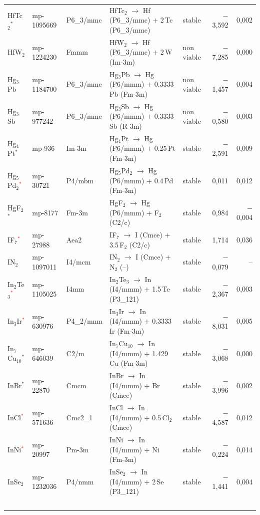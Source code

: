 \begin{longtable}{@{}ll l@{\hspace{4pt}} p{4.6cm} l@{\hspace{4pt}} rr@{}}
HfTc$_{2}$$^*$ & mp-1095669 & P6\_3/mmc & HfTc$_{2}$ $\to$ Hf (P6\_3/mmc) $+$ 2\,Tc (P6\_3/mmc) & stable & $-$3{,}592 & 0{,}002 \\
HfW$_{2}$ & mp-1224230 & Fmmm & HfW$_{2}$ $\to$ Hf (P6\_3/mmc) $+$ 2\,W (Im-3m) & non viable & $-$7{,}285 & 0{,}000 \\
Hg$_{3}$Pb & mp-1184700 & P6\_3/mmc & Hg$_{3}$Pb $\to$ Hg (P6/mmm) $+$ 0.3333\,Pb (Fm-3m) & non viable & $-$1{,}457 & 0{,}004 \\
Hg$_{3}$Sb & mp-977242 & P6\_3/mmc & Hg$_{3}$Sb $\to$ Hg (P6/mmm) $+$ 0.3333\,Sb (R-3m) & non viable & $-$0{,}580 & 0{,}003 \\
Hg$_{4}$Pt$^*$ & mp-936 & Im-3m & Hg$_{4}$Pt $\to$ Hg (P6/mmm) $+$ 0.25\,Pt (Fm-3m) & stable & $-$2{,}591 & 0{,}009 \\
Hg$_{5}$Pd$_{2}$\textcolor{red}{$^*$} & mp-30721 & P4/mbm & Hg$_{5}$Pd$_{2}$ $\to$ Hg (P6/mmm) $+$ 0.4\,Pd (Fm-3m) & stable & 0{,}011 & 0{,}012 \\
HgF$_{2}$$^*$ & mp-8177 & Fm-3m & HgF$_{2}$ $\to$ Hg (P6/mmm) $+$ F$_{2}$ (C2/c) & stable & 0{,}984 & $-$0{,}004 \\
IF$_{7}$\textcolor{red}{$^*$} & mp-27988 & Aea2 & IF$_{7}$ $\to$ I (Cmce) $+$ 3.5\,F$_{2}$ (C2/c) & stable & 1{,}714 & 0{,}036 \\
IN$_{2}$ & mp-1097011 & I4/mcm & IN$_{2}$ $\to$ I (Cmce) $+$ N$_{2}$ (--) & stable & $-$0{,}079 & -- \\
In$_{2}$Te$_{3}$\textcolor{red}{$^*$} & mp-1105025 & I4mm & In$_{2}$Te$_{3}$ $\to$ In (I4/mmm) $+$ 1.5\,Te (P3\_121) & stable & $-$2{,}367 & 0{,}003 \\
In$_{3}$Ir\textcolor{red}{$^*$} & mp-630976 & P4\_2/mnm & In$_{3}$Ir $\to$ In (I4/mmm) $+$ 0.3333\,Ir (Fm-3m) & stable & $-$8{,}031 & 0{,}005 \\
In$_{7}$Cu$_{10}$$^*$ & mp-646039 & C2/m & In$_{7}$Cu$_{10}$ $\to$ In (I4/mmm) $+$ 1.429\,Cu (Fm-3m) & stable & $-$3{,}068 & 0{,}000 \\
InBr$^*$ & mp-22870 & Cmcm & InBr $\to$ In (I4/mmm) $+$ Br (Cmce) & stable & $-$3{,}996 & 0{,}002 \\
InCl\textcolor{red}{$^*$} & mp-571636 & Cmc2\_1 & InCl $\to$ In (I4/mmm) $+$ 0.5\,Cl$_{2}$ (Cmce) & stable & $-$4{,}587 & 0{,}012 \\
InNi\textcolor{red}{$^*$} & mp-20997 & Pm-3m & InNi $\to$ In (I4/mmm) $+$ Ni (Fm-3m) & stable & $-$0{,}224 & 0{,}014 \\
InSe$_{2}$ & mp-1232036 & P4/nmm & InSe$_{2}$ $\to$ In (I4/mmm) $+$ 2\,Se (P3\_121) & stable & $-$1{,}441 & 0{,}004 \\
$$
\end{longtable}
